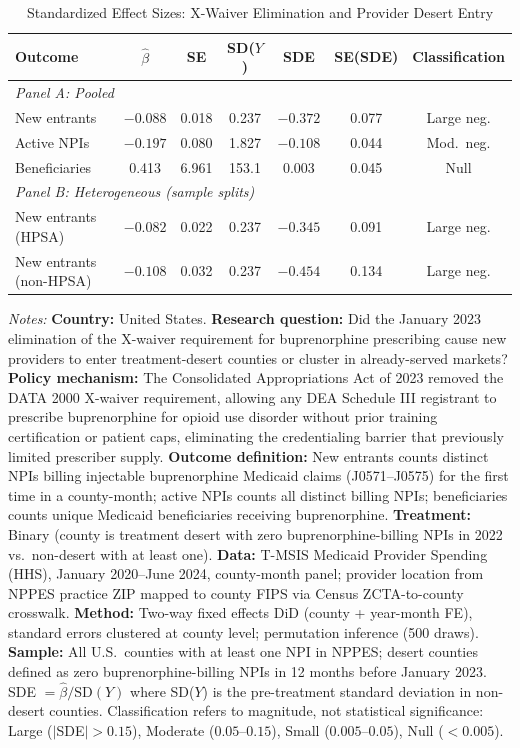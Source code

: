 \begin{table}[htbp]
\centering
\caption{Standardized Effect Sizes: X-Waiver Elimination and Provider Desert Entry}
\label{tab:sde}
\small
\begin{tabular}{lcccccc}
\hline\hline
Outcome & $\hat{\beta}$ & SE & SD($Y$) & SDE & SE(SDE) & Classification \\
\hline
\multicolumn{7}{l}{\textit{Panel A: Pooled}} \\
New entrants & $-0.088$ & 0.018 & 0.237 & $-0.372$ & 0.077 & Large neg. \\
Active NPIs & $-0.197$ & 0.080 & 1.827 & $-0.108$ & 0.044 & Mod.\ neg. \\
Beneficiaries & 0.413 & 6.961 & 153.1 & 0.003 & 0.045 & Null \\
\hline
\multicolumn{7}{l}{\textit{Panel B: Heterogeneous (sample splits)}} \\
New entrants (HPSA) & $-0.082$ & 0.022 & 0.237 & $-0.345$ & 0.091 & Large neg. \\
New entrants (non-HPSA) & $-0.108$ & 0.032 & 0.237 & $-0.454$ & 0.134 & Large neg. \\
\hline\hline
\end{tabular}

\vspace{0.5em}
\parbox{\textwidth}{\scriptsize \textit{Notes:} \textbf{Country:} United States. \textbf{Research question:} Did the January 2023 elimination of the X-waiver requirement for buprenorphine prescribing cause new providers to enter treatment-desert counties or cluster in already-served markets? \textbf{Policy mechanism:} The Consolidated Appropriations Act of 2023 removed the DATA 2000 X-waiver requirement, allowing any DEA Schedule III registrant to prescribe buprenorphine for opioid use disorder without prior training certification or patient caps, eliminating the credentialing barrier that previously limited prescriber supply. \textbf{Outcome definition:} New entrants counts distinct NPIs billing injectable buprenorphine Medicaid claims (J0571--J0575) for the first time in a county-month; active NPIs counts all distinct billing NPIs; beneficiaries counts unique Medicaid beneficiaries receiving buprenorphine. \textbf{Treatment:} Binary (county is treatment desert with zero buprenorphine-billing NPIs in 2022 vs.\ non-desert with at least one). \textbf{Data:} T-MSIS Medicaid Provider Spending (HHS), January 2020--June 2024, county-month panel; provider location from NPPES practice ZIP mapped to county FIPS via Census ZCTA-to-county crosswalk. \textbf{Method:} Two-way fixed effects DiD (county + year-month FE), standard errors clustered at county level; permutation inference (500 draws). \textbf{Sample:} All U.S.\ counties with at least one NPI in NPPES; desert counties defined as zero buprenorphine-billing NPIs in 12 months before January 2023. SDE $= \hat{\beta} / \text{SD}(Y)$ where SD($Y$) is the pre-treatment standard deviation in non-desert counties. Classification refers to magnitude, not statistical significance: Large ($|$SDE$| > 0.15$), Moderate ($0.05$--$0.15$), Small ($0.005$--$0.05$), Null ($< 0.005$).}
\end{table}
